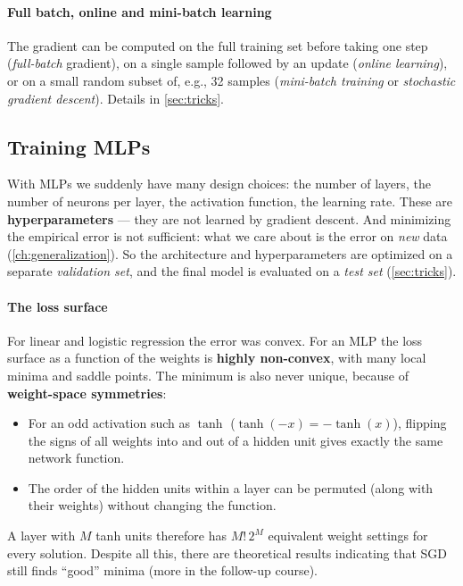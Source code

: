 \documentclass[11pt, oneside]{book}
\let\originalsubsection\subsection
\renewcommand{\subsection}{\Needspace{6\baselineskip}\originalsubsection}
\begin{document}
\paragraph{Full batch, online and mini-batch learning}
The gradient can be computed on the full training set before taking one
step (\emph{full-batch} gradient), on a single sample followed by an update
(\emph{online learning}), or on a small random subset of, e.g., 32 samples
(\emph{mini-batch training} or \emph{stochastic gradient descent}).
Details in \cref{sec:tricks}.

\subsection{Training MLPs}

With MLPs we suddenly have many design choices: the number of layers, the
number of neurons per layer, the activation function, the learning rate.
These are \textbf{hyperparameters} --- they are not learned by gradient
descent. And minimizing the empirical error is not sufficient: what we care
about is the error on \emph{new} data (\cref{ch:generalization}). So the
architecture and hyperparameters are optimized on a separate
\emph{validation set}, and the final model is evaluated on a \emph{test set}
(\cref{sec:tricks}).

\paragraph{The loss surface}
For linear and logistic regression the error was convex. For an MLP the
loss surface as a function of the weights is \textbf{highly non-convex},
with many local minima and saddle points. The minimum is also never unique,
because of \textbf{weight-space symmetries}:
\begin{itemize}
  \item For an odd activation such as $\tanh$ ($\tanh(-x) = -\tanh(x)$),
    flipping the signs of all weights into and out of a hidden unit gives
    exactly the same network function.
  \item The order of the hidden units within a layer can be permuted (along
    with their weights) without changing the function.
\end{itemize}
A layer with $M$ tanh units therefore has $M!\,2^M$ equivalent weight
settings for every solution. Despite all this, there are theoretical results
indicating that SGD still finds ``good'' minima (more in the follow-up
course).
\end{document}
